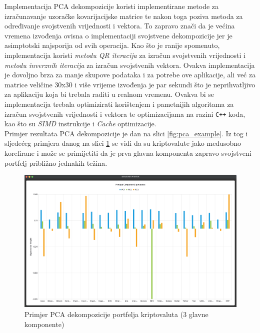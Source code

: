\documentclass[zavrsnirad]{fer}
\begin{document}
Implementacija PCA dekompozicije koristi implementirane metode
za izračunavanje uzoračke kovarijacijske matrice te nakon toga poziva
metoda za određivanje svojstvenih vrijednosti i vektora. To zapravo znači
da je većina vremena izvođenja ovisna o implementaciji svojstvene dekompozicije
jer je asimptotski najsporija od svih operacija. Kao što je ranije spomenuto,
implementacija koristi \emph{metodu QR iteracija} za izračun svojstvenih
vrijednosti
i \emph{metodu inverznih iteracija} za izračun svojstvenih vektora.
Ovakva implementacija je dovoljno brza za manje skupove podataka i za
potrebe ove aplikacije, ali već za matrice veličine 30x30 i više
vrijeme izvođenja je par sekundi što je neprihvatljivo za
aplikaciju koja bi trebala raditi u realnom vremenu. Ovakva bi se
implementacija trebala optimizirati korištenjem i pametnijih algoritama
za izračun svojstvenih vrijednosti i vektora te optimizacijama na
razini \texttt{C++} koda, kao što su \emph{SIMD} instrukcije i \emph{Cache}
optimizacije.\\
Primjer rezultata PCA dekompozicije je dan na slici \ref{fig:pca_example}.
Iz tog i sljedećeg primjera danog na slici \ref{fig:pca_example2}
se vidi da su kriptovalute jako međusobno korelirane i može se primijetiti
da je prva glavna komponenta zapravo svojstveni portfelj približno
jednakih težina.
\begin{figure}[H]
    \centering
    \includegraphics[width=1.0\textwidth]{Figures/pca_example2.png}
    \caption{Primjer PCA dekompozicije portfelja kriptovaluta (3 glavne komponente)}
    \label{fig:pca_example2}
\end{figure}
\end{document}

